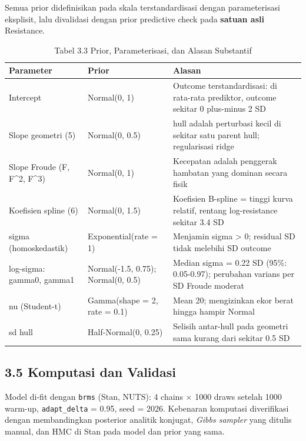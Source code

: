 \documentclass[
]{article}
\begin{document}
Semua prior didefinisikan pada skala terstandardisasi dengan
parameterisasi eksplisit, lalu divalidasi dengan prior predictive check
pada \textbf{satuan asli} Resistance.

\begingroup\fontsize{8.5}{10.5}\selectfont

\begin{longtable}[t]{>{\raggedright\arraybackslash}p{3.40cm}>{\raggedright\arraybackslash}p{4.50cm}>{\raggedright\arraybackslash}p{9.00cm}}
\caption{\label{tab:tabel_prior}Tabel 3.3 Prior, Parameterisasi, dan Alasan Substantif}\\
\toprule
Parameter & Prior & Alasan\\
\midrule
Intercept & Normal(0, 1) & Outcome terstandardisasi: di rata-rata prediktor, outcome sekitar 0 plus-minus 2 SD\\
Slope geometri (5) & Normal(0, 0.5) & 22 hull adalah perturbasi kecil di sekitar satu parent hull; regularisasi ridge\\
Slope Froude (F, F\textasciicircum{}2, F\textasciicircum{}3) & Normal(0, 1) & Kecepatan adalah penggerak hambatan yang dominan secara fisik\\
Koefisien spline (6) & Normal(0, 1.5) & Koefisien B-spline = tinggi kurva relatif, rentang log-resistance sekitar 3.4 SD\\
sigma (homoskedastik) & Exponential(rate = 1) & Menjamin sigma > 0; residual SD tidak melebihi SD outcome\\
\addlinespace
log-sigma: gamma0, gamma1 & Normal(-1.5, 0.75); Normal(0, 0.5) & Median sigma = 0.22 SD (95\%: 0.05-0.97); perubahan varians per SD Froude moderat\\
nu (Student-t) & Gamma(shape = 2, rate = 0.1) & Mean 20; mengizinkan ekor berat hingga hampir Normal\\
sd hull & Half-Normal(0, 0.25) & Selisih antar-hull pada geometri sama kurang dari sekitar 0.5 SD\\
\bottomrule
\end{longtable}
\endgroup{}

\subsection{3.5 Komputasi dan Validasi}\label{komputasi-dan-validasi}

Model di-fit dengan \texttt{brms} (Stan, NUTS): 4 chains × 1000 draws
setelah 1000 warm-up, \texttt{adapt\_delta} = 0.95, seed = 2026.
Kebenaran komputasi diverifikasi dengan membandingkan posterior analitik
konjugat, \emph{Gibbs sampler} yang ditulis manual, dan HMC di Stan pada
model dan prior yang sama.
\end{document}
